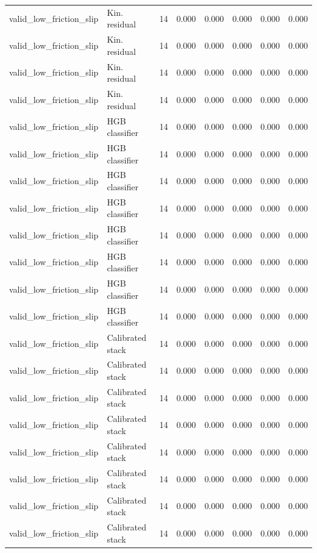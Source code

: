 {\begin{longtable}{llrrrrrr}
valid\_low\_friction\_slip & Kin. residual & 14 & 0.000 & 0.000 & 0.000 & 0.000 & 0.000 \\
valid\_low\_friction\_slip & Kin. residual & 14 & 0.000 & 0.000 & 0.000 & 0.000 & 0.000 \\
valid\_low\_friction\_slip & Kin. residual & 14 & 0.000 & 0.000 & 0.000 & 0.000 & 0.000 \\
valid\_low\_friction\_slip & Kin. residual & 14 & 0.000 & 0.000 & 0.000 & 0.000 & 0.000 \\
valid\_low\_friction\_slip & HGB classifier & 14 & 0.000 & 0.000 & 0.000 & 0.000 & 0.000 \\
valid\_low\_friction\_slip & HGB classifier & 14 & 0.000 & 0.000 & 0.000 & 0.000 & 0.000 \\
valid\_low\_friction\_slip & HGB classifier & 14 & 0.000 & 0.000 & 0.000 & 0.000 & 0.000 \\
valid\_low\_friction\_slip & HGB classifier & 14 & 0.000 & 0.000 & 0.000 & 0.000 & 0.000 \\
valid\_low\_friction\_slip & HGB classifier & 14 & 0.000 & 0.000 & 0.000 & 0.000 & 0.000 \\
valid\_low\_friction\_slip & HGB classifier & 14 & 0.000 & 0.000 & 0.000 & 0.000 & 0.000 \\
valid\_low\_friction\_slip & HGB classifier & 14 & 0.000 & 0.000 & 0.000 & 0.000 & 0.000 \\
valid\_low\_friction\_slip & HGB classifier & 14 & 0.000 & 0.000 & 0.000 & 0.000 & 0.000 \\
valid\_low\_friction\_slip & Calibrated stack & 14 & 0.000 & 0.000 & 0.000 & 0.000 & 0.000 \\
valid\_low\_friction\_slip & Calibrated stack & 14 & 0.000 & 0.000 & 0.000 & 0.000 & 0.000 \\
valid\_low\_friction\_slip & Calibrated stack & 14 & 0.000 & 0.000 & 0.000 & 0.000 & 0.000 \\
valid\_low\_friction\_slip & Calibrated stack & 14 & 0.000 & 0.000 & 0.000 & 0.000 & 0.000 \\
valid\_low\_friction\_slip & Calibrated stack & 14 & 0.000 & 0.000 & 0.000 & 0.000 & 0.000 \\
valid\_low\_friction\_slip & Calibrated stack & 14 & 0.000 & 0.000 & 0.000 & 0.000 & 0.000 \\
valid\_low\_friction\_slip & Calibrated stack & 14 & 0.000 & 0.000 & 0.000 & 0.000 & 0.000 \\
valid\_low\_friction\_slip & Calibrated stack & 14 & 0.000 & 0.000 & 0.000 & 0.000 & 0.000 \\

\end{longtable}}
